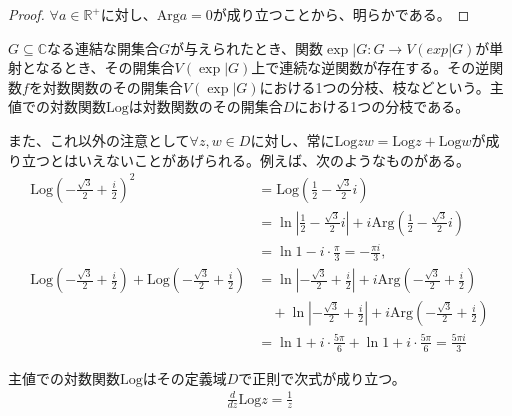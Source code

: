 \documentclass[dvipdfmx]{jsarticle}
\begin{document}
\begin{proof}
$\forall a \in \mathbb{R}^{+}$に対し、$\mathrm{Arg}a = 0$が成り立つことから、明らかである。
\end{proof}
\begin{dfn}
$G \subseteq \mathbb{C}$なる連結な開集合$G$が与えられたとき、関数$\exp|G:G \rightarrow V\left( exp|G \right)$が単射となるとき、その開集合$V\left( \exp|G \right)$上で連続な逆関数が存在する。その逆関数$f$を対数関数のその開集合$V\left( \exp|G \right)$における1つの分枝、枝などという。主値での対数関数$\mathrm{Log}$は対数関数のその開集合$D$における1つの分枝である。
\end{dfn}\par
また、これ以外の注意として$\forall z,w \in D$に対し、常に$\mathrm{Log}{zw} = \mathrm{Log}z + \mathrm{Log}w$が成り立つとはいえないことがあげられる。例えば、次のようなものがある。
\begin{align*}
\mathrm{Log}\left( - \frac{\sqrt{3}}{2} + \frac{i}{2} \right)^{2} &= \mathrm{Log}\left( \frac{1}{2} - \frac{\sqrt{3}}{2}i \right)\\
&= \ln\left| \frac{1}{2} - \frac{\sqrt{3}}{2}i \right| + i\mathrm{Arg}\left( \frac{1}{2} - \frac{\sqrt{3}}{2}i \right)\\
&= \ln 1 - i \cdot \frac{\pi}{3} = - \frac{\pi i}{3},\\
\mathrm{Log}\left( - \frac{\sqrt{3}}{2} + \frac{i}{2} \right) + \mathrm{Log}\left( - \frac{\sqrt{3}}{2} + \frac{i}{2} \right) &= \ln\left| - \frac{\sqrt{3}}{2} + \frac{i}{2} \right| + i\mathrm{Arg}\left( - \frac{\sqrt{3}}{2} + \frac{i}{2} \right) \\
&\quad + \ln\left| - \frac{\sqrt{3}}{2} + \frac{i}{2} \right| + i\mathrm{Arg}\left( - \frac{\sqrt{3}}{2} + \frac{i}{2} \right)\\
&= \ln 1 + i \cdot \frac{5\pi}{6} + \ln 1 + i \cdot \frac{5\pi}{6} = \frac{5\pi i}{3}
\end{align*}
\begin{thm}\label{4.3.3.6}
主値での対数関数$\mathrm{Log}$はその定義域$D$で正則で次式が成り立つ。
\begin{align*}
\frac{d}{dz}\mathrm{Log}z = \frac{1}{z}
\end{align*}
\end{thm}
\end{document}
